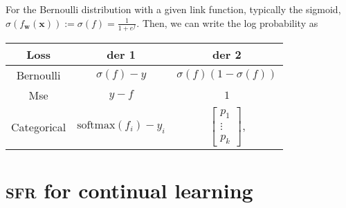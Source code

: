 \documentclass{article}
\newcommand{\our}{\textsc{sfr}\xspace}
\newcommand{\mbf}[1]{\mathbf{#1}}
\newcommand{\vf}{\mbf{f}}
\newcommand{\vx}{\mbf{x}}
\newcommand{\vw}{\mbf{w}}
\begin{document}
 For the Bernoulli distribution with a given link function, typically the sigmoid, $\sigma(f_{\vw}(\vx)):= \sigma(f) = \frac{1}{1+e^f}$. Then, we can write the log probability as

\begin{table}[!ht]
\centering
\begin{tabular}{@{}ccc@{}}
\toprule
Loss        & der 1 & der 2 \\ \midrule
Bernoulli    & $\sigma(f) - y$   & $\sigma(f)(1-\sigma(f))$      \\
Mse         & $y - f$      & $1$       \\
Categorical &  $\textrm{softmax}(f_i) - y_i$     &   $\begin{bmatrix}
		p_1\\ \vdots\\p_k
	\end{bmatrix}$,     \\ \bottomrule
\end{tabular}
\end{table}



\section{\our for continual learning}
\label{app:cl}
\end{document}
